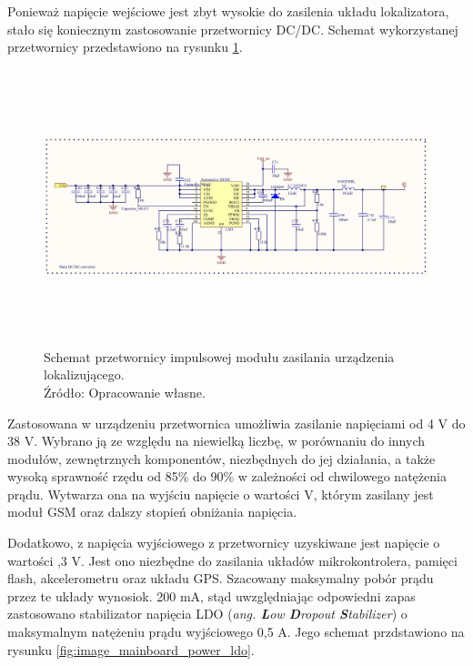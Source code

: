 \pagebreak
Ponieważ napięcie wejściowe jest zbyt wysokie do zasilenia układu lokalizatora, stało się koniecznym zastosowanie przetwornicy DC/DC. Schemat wykorzystanej przetwornicy przedstawiono na rysunku \ref{fig:image_mainboard_power_converter}.

\begin{figure}[H]
	\centering
	\includegraphics[width=17cm, height=8cm]{img/schematics/mainboard_power_converter.jpg}
	\caption{Schemat przetwornicy impulsowej modułu zasilania urządzenia lokalizującego. \\ Źródło: Opracowanie własne.}
	\label{fig:image_mainboard_power_converter}
\end{figure}

Zastosowana w urządzeniu przetwornica umożliwia zasilanie napięciami od 4 V do 38 V. Wybrano ją ze względu na niewielką liczbę, w porównaniu do innych modułów, zewnętrznych komponentów, niezbędnych do jej działania, a także wysoką sprawność rzędu od 85\% do 90\% w zależności od chwilowego natężenia prądu. Wytwarza ona na wyjściu napięcie o wartości  V, którym zasilany jest moduł GSM oraz dalszy stopień obniżania napięcia.

Dodatkowo, z napięcia wyjściowego z przetwornicy uzyskiwane jest napięcie o wartości ,3 V. Jest ono niezbędne do zasilania układów mikrokontrolera, pamięci flash, akcelerometru oraz układu GPS. Szacowany maksymalny pobór prądu przez te układy wynosi\linebreak ok. 200 mA, stąd uwzględniając odpowiedni zapas zastosowano stabilizator napięcia LDO \linebreak (\textit{ang. \textbf{L}ow \textbf{D}ropout \textbf{S}tabilizer}) o maksymalnym natężeniu prądu wyjściowego 0,5 A. Jego schemat przdstawiono na rysunku \ref{fig:image_mainboard_power_ldo}.

